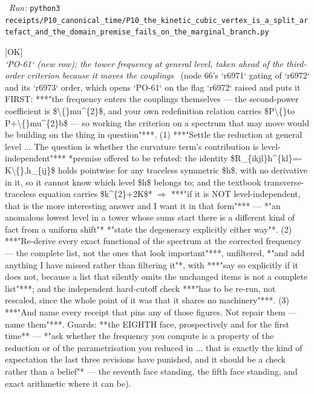 \begin{description}
\ \emph{Run:} \texttt{python3 receipts/P10\_canonical\_time/P10\_the\_kinetic\_cubic\_vertex\_is\_a\_split\_artefact\_and\_the\_domain\_premise\_fails\_on\_the\_marginal\_branch.py}
\item[\rcptlabel{P10_the_frequency_shift_is_the_curvature_term_at_every_level_so_the_log_coefficient_is_fifteen_quarters}{P10R37}\textbf{P10R37}\quad\texttt{P10\_the\_frequency\_shift\_is\_the\_curvature\_term\_at\_every\_level\_so\_the\_log\_coefficient\_is\_fifteen\_quarters}]\hfill\textsf{[OK]}\\
\textit{`PO-61` (new row); the tower frequency at general level, taken ahead of the third-order criterion because it moves the couplings} \ (node 66's `r6971` gating of `r6972` and its `r6973` order, which opens `PO-61` on the flag `r6972` raised and puts it FIRST: ***"the frequency enters the couplings themselves --- the second-power coefficient is \$\textbackslash\{\}mu\textasciicircum{}\{2\}\$, and your own redefinition relation carries \$P\textbackslash\{\}to P+\textbackslash\{\}mu\textasciicircum{}\{2\}b\$ --- so working the criterion on a spectrum that may move would be building on the thing in question"***. (1) ***"Settle the reduction at general level ... The question is whether the curvature term's contribution is level-independent"***  *premise offered to be refuted: the identity \$R\_\{ikjl\}h\textasciicircum{}\{kl\}=-K\textbackslash\{\},h\_\{ij\}\$ holds pointwise for any traceless symmetric \$h\$, with no derivative in it, so it cannot know which level \$h\$ belongs to; and the textbook transverse-traceless equation carries \$k\textasciicircum{}\{2\}+2K\$* \ensuremath{\Rightarrow}  ***"if it is NOT level-independent, that is the more interesting answer and I want it in that form"*** --- *"an anomalous lowest level in a tower whose sums start there is a different kind of fact from a uniform shift"*  *"state the degeneracy explicitly either way"*. (2) ***"Re-derive every exact functional of the spectrum at the corrected frequency --- the complete list, not the ones that look important"***, unfiltered, *"and add anything I have missed rather than filtering it"*, with  ***"say so explicitly if it does not, because a list that silently omits the unchanged items is not a complete list"***; and the independent hard-cutoff check ***"has to be re-run, not rescaled, since the whole point of it was that it shares no machinery"***. (3) ***"And name every receipt that pins any of those figures. Not repair them --- name them"***.  Guards: **the EIGHTH face, prospectively and for the first time** --- *"ask whether the frequency you compute is a property of the reduction or of the parametrisation you reduced in ... that is exactly the kind of expectation the last three revisions have punished, and it should be a check rather than a belief"* --- the seventh face standing, the fifth face standing, and exact arithmetic where it can be). 

\end{description}
